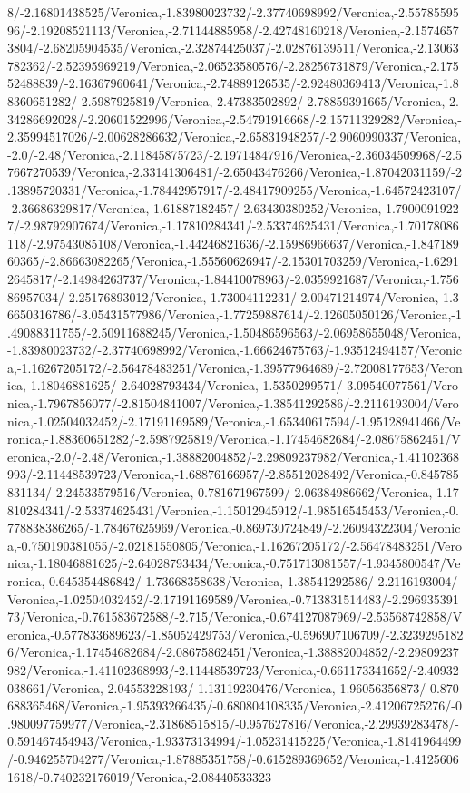 {\begin{tikzternal}
8/-2.16801438525/Veronica,-1.83980023732/-2.37740698992/Veronica,-2.5578559596/-2.19208521113/Veronica,-2.71144885958/-2.42748160218/Veronica,-2.15746573804/-2.68205904535/Veronica,-2.32874425037/-2.02876139511/Veronica,-2.13063782362/-2.52395969219/Veronica,-2.06523580576/-2.28256731879/Veronica,-2.17552488839/-2.16367960641/Veronica,-2.74889126535/-2.92480369413/Veronica,-1.88360651282/-2.5987925819/Veronica,-2.47383502892/-2.78859391665/Veronica,-2.34286692028/-2.20601522996/Veronica,-2.54791916668/-2.15711329282/Veronica,-2.35994517026/-2.00628286632/Veronica,-2.65831948257/-2.9060990337/Veronica,-2.0/-2.48/Veronica,-2.11845875723/-2.19714847916/Veronica,-2.36034509968/-2.57667270539/Veronica,-2.33141306481/-2.65043476266/Veronica,-1.87042031159/-2.13895720331/Veronica,-1.78442957917/-2.48417909255/Veronica,-1.64572423107/-2.36686329817/Veronica,-1.61887182457/-2.63430380252/Veronica,-1.79000919227/-2.98792907674/Veronica,-1.17810284341/-2.53374625431/Veronica,-1.70178086118/-2.97543085108/Veronica,-1.44246821636/-2.15986966637/Veronica,-1.84718960365/-2.86663082265/Veronica,-1.55560626947/-2.15301703259/Veronica,-1.62912645817/-2.14984263737/Veronica,-1.84410078963/-2.0359921687/Veronica,-1.75686957034/-2.25176893012/Veronica,-1.73004112231/-2.00471214974/Veronica,-1.36650316786/-3.05431577986/Veronica,-1.77259887614/-2.12605050126/Veronica,-1.49088311755/-2.50911688245/Veronica,-1.50486596563/-2.06958655048/Veronica,-1.83980023732/-2.37740698992/Veronica,-1.66624675763/-1.93512494157/Veronica,-1.16267205172/-2.56478483251/Veronica,-1.39577964689/-2.72008177653/Veronica,-1.18046881625/-2.64028793434/Veronica,-1.5350299571/-3.09540077561/Veronica,-1.7967856077/-2.81504841007/Veronica,-1.38541292586/-2.2116193004/Veronica,-1.02504032452/-2.17191169589/Veronica,-1.65340617594/-1.95128941466/Veronica,-1.88360651282/-2.5987925819/Veronica,-1.17454682684/-2.08675862451/Veronica,-2.0/-2.48/Veronica,-1.38882004852/-2.29809237982/Veronica,-1.41102368993/-2.11448539723/Veronica,-1.68876166957/-2.85512028492/Veronica,-0.845785831134/-2.24533579516/Veronica,-0.781671967599/-2.06384986662/Veronica,-1.17810284341/-2.53374625431/Veronica,-1.15012945912/-1.98516545453/Veronica,-0.778838386265/-1.78467625969/Veronica,-0.869730724849/-2.26094322304/Veronica,-0.750190381055/-2.02181550805/Veronica,-1.16267205172/-2.56478483251/Veronica,-1.18046881625/-2.64028793434/Veronica,-0.751713081557/-1.9345800547/Veronica,-0.645354486842/-1.73668358638/Veronica,-1.38541292586/-2.2116193004/Veronica,-1.02504032452/-2.17191169589/Veronica,-0.713831514483/-2.29693539173/Veronica,-0.761583672588/-2.715/Veronica,-0.674127087969/-2.53568742858/Veronica,-0.577833689623/-1.85052429753/Veronica,-0.596907106709/-2.32392951826/Veronica,-1.17454682684/-2.08675862451/Veronica,-1.38882004852/-2.29809237982/Veronica,-1.41102368993/-2.11448539723/Veronica,-0.661173341652/-2.40932038661/Veronica,-2.04553228193/-1.13119230476/Veronica,-1.96056356873/-0.870688365468/Veronica,-1.95393266435/-0.680804108335/Veronica,-2.41206725276/-0.980097759977/Veronica,-2.31868515815/-0.957627816/Veronica,-2.29939283478/-0.591467454943/Veronica,-1.93373134994/-1.05231415225/Veronica,-1.8141964499/-0.946255704277/Veronica,-1.87885351758/-0.615289369652/Veronica,-1.41256061618/-0.740232176019/Veronica,-2.08440533323
\end{tikzternal}}
